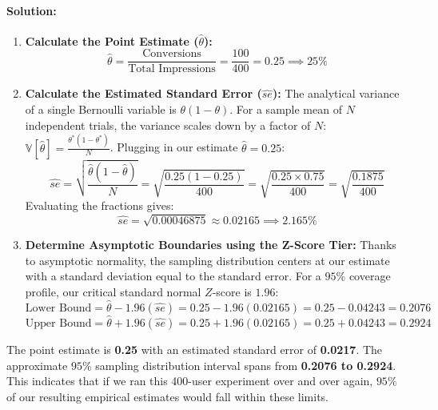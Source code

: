 \documentclass{article}
\begin{document}
\paragraph{Solution:}
\begin{enumerate}
    \item \textbf{Calculate the Point Estimate ($\hat{\theta}$):}
    \begin{equation}
    \hat{\theta} = \frac{\text{Conversions}}{\text{Total Impressions}} = \frac{100}{400} = 0.25 \implies 25\%
    \end{equation}
    
    \item \textbf{Calculate the Estimated Standard Error ($\hat{se}$):}
    The analytical variance of a single Bernoulli variable is $\theta(1-\theta)$. For a sample mean of $N$ independent trials, the variance scales down by a factor of $N$: $\mathbb{V}[\hat{\theta}] = \frac{\theta^*(1-\theta^*)}{N}$. Plugging in our estimate $\hat{\theta} = 0.25$:
    \begin{equation}
    \hat{se} = \sqrt{\frac{\hat{\theta}(1 - \hat{\theta})}{N}} = \sqrt{\frac{0.25(1 - 0.25)}{400}} = \sqrt{\frac{0.25 \times 0.75}{400}} = \sqrt{\frac{0.1875}{400}}
    \end{equation}
    Evaluating the fractions gives:
    \begin{equation}
    \hat{se} = \sqrt{0.00046875} \approx 0.02165 \implies 2.165\%
    \end{equation}
    
    \item \textbf{Determine Asymptotic Boundaries using the Z-Score Tier:}
    Thanks to asymptotic normality, the sampling distribution centers at our estimate with a standard deviation equal to the standard error. For a $95\%$ coverage profile, our critical standard normal $Z$-score is $1.96$:
    \begin{equation}
    \text{Lower Bound} = \hat{\theta} - 1.96(\hat{se}) = 0.25 - 1.96(0.02165) = 0.25 - 0.04243 = 0.2076
    \end{equation}
    \begin{equation}
    \text{Upper Bound} = \hat{\theta} + 1.96(\hat{se}) = 0.25 + 1.96(0.02165) = 0.25 + 0.04243 = 0.2924
    \end{equation}
\end{enumerate}
The point estimate is \textbf{0.25} with an estimated standard error of \textbf{0.0217}. The approximate $95\%$ sampling distribution interval spans from \textbf{0.2076 to 0.2924}. This indicates that if we ran this 400-user experiment over and over again, $95\%$ of our resulting empirical estimates would fall within these limits.
\end{document}
